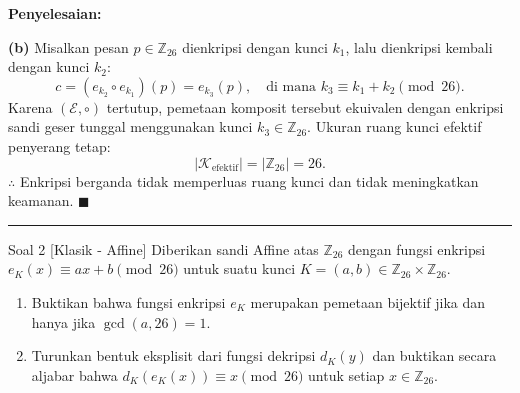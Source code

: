 \documentclass[11pt,a4paper]{article}
\newenvironment{solusi}{\noindent\textbf{\textsf{Penyelesaian:}}\par\vspace{0.2em}}{\hfill$\blacksquare$\vspace{1em}\par\hrule\vspace{1em}}
\begin{document}
\begin{solusi}
\textbf{(b)} Misalkan pesan $p \in \mathbb{Z}_{26}$ dienkripsi dengan kunci $k_1$, lalu dienkripsi kembali dengan kunci $k_2$:
\[
c = (e_{k_2} \circ e_{k_1})(p) = e_{k_3}(p), \quad \text{di mana } k_3 \equiv k_1 + k_2 \pmod{26}.
\]
Karena $(\mathcal{E}, \circ)$ tertutup, pemetaan komposit tersebut ekuivalen dengan enkripsi sandi geser tunggal menggunakan kunci $k_3 \in \mathbb{Z}_{26}$. Ukuran ruang kunci efektif penyerang tetap:
\[
|\mathcal{K}_{\text{efektif}}| = |\mathbb{Z}_{26}| = 26.
\]
$\therefore$ Enkripsi berganda tidak memperluas ruang kunci dan tidak meningkatkan keamanan.
\end{solusi}

\begin{soalklasik}{Soal 2 [Klasik - Affine]}
Diberikan sandi Affine atas $\mathbb{Z}_{26}$ dengan fungsi enkripsi $e_K(x) \equiv ax + b \pmod{26}$ untuk suatu kunci $K = (a, b) \in \mathbb{Z}_{26} \times \mathbb{Z}_{26}$.
\begin{enumerate}[label=(\alph*)]
    \item Buktikan bahwa fungsi enkripsi $e_K$ merupakan pemetaan bijektif jika dan hanya jika $\gcd(a, 26) = 1$.
    \item Turunkan bentuk eksplisit dari fungsi dekripsi $d_K(y)$ dan buktikan secara aljabar bahwa $d_K(e_K(x)) \equiv x \pmod{26}$ untuk setiap $x \in \mathbb{Z}_{26}$.
\end{enumerate}
\end{soalklasik}
\end{document}
